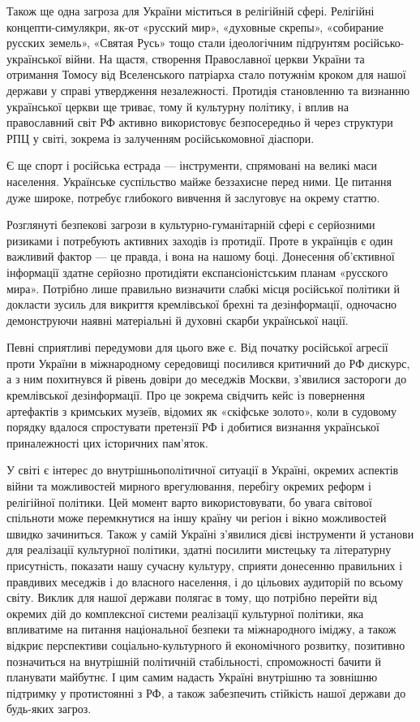 Також ще одна загроза для України міститься в релігійній сфері. Релігійні
концепти-симулякри, як-от «русский мир», «духовные скрепы», «собирание русских
земель», «Святая Русь» тощо стали ідеологічним підґрунтям російсько-української
війни. На щастя, створення Православної церкви України та отримання Томосу від
Вселенського патріарха стало потужнім кроком для нашої держави у справі
утвердження незалежності. Протидія становленню та визнанню української церкви
ще триває, тому й культурну політику, і вплив на православний світ РФ активно
використовує безпосередньо й через структури РПЦ у світі, зокрема із залученням
російськомовної діаспори.

Є ще спорт і російська естрада — інструменти, спрямовані на великі маси
населення. Українське суспільство майже беззахисне перед ними. Це питання дуже
широке, потребує глибокого вивчення й заслуговує на окрему статтю.


Розглянуті безпекові загрози в культурно-гуманітарній сфері є серйозними
ризиками і потребують активних заходів із протидії. Проте в українців є один
важливий фактор — це правда, і вона на нашому боці. Донесення об’єктивної
інформації здатне серйозно протидіяти експансіоністським планам «русского
мира». Потрібно лише правильно визначити слабкі місця російської політики й
докласти зусиль для викриття кремлівської брехні та дезінформації, одночасно
демонструючи наявні матеріальні й духовні скарби української нації.

Певні сприятливі передумови для цього вже є. Від початку російської агресії
проти України в міжнародному середовищі посилився критичний до РФ дискурс, а з
ним похитнувся й рівень довіри до меседжів Москви, з’явилися застороги до
кремлівської дезінформації. Про це зокрема свідчить кейс із повернення
артефактів з кримських музеїв, відомих як «скіфське золото», коли в судовому
порядку вдалося спростувати претензії РФ і добитися визнання української
приналежності цих історичних пам’яток.

У світі є інтерес до внутрішньополітичної ситуації в Україні, окремих аспектів
війни та можливостей мирного врегулювання, перебігу окремих реформ і релігійної
політики. Цей момент варто використовувати, бо увага світової спільноти може
перемкнутися на іншу країну чи регіон і вікно можливостей швидко зачиниться.
Також у самій Україні з’явилися дієві інструменти й установи для реалізації
культурної політики, здатні посилити мистецьку та літературну присутність,
показати нашу сучасну культуру, сприяти донесенню правильних і правдивих
меседжів і до власного населення, і до цільових аудиторій по всьому світу.
Виклик для нашої держави полягає в тому, що потрібно перейти від окремих дій до
комплексної системи реалізації культурної політики, яка впливатиме на питання
національної безпеки та міжнародного іміджу, а також відкриє перспективи
соціально-культурного й економічного розвитку, позитивно позначиться на
внутрішній політичній стабільності, спроможності бачити й планувати майбутнє. І
цим самим надасть Україні внутрішню та зовнішню підтримку у протистоянні з РФ,
а також забезпечить стійкість нашої держави до будь-яких загроз. 
